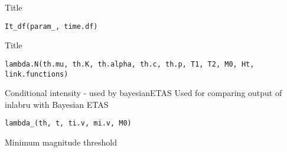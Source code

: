 \documentclass[letterpaper]{book}
\begin{document}
%
\begin{Arguments}
\begin{ldescription}
\item[\code{b}] 
\end{ldescription}
\end{Arguments}
%
\begin{Description}\relax
Title
\end{Description}
%
\begin{Usage}
\begin{verbatim}
It_df(param_, time.df)
\end{verbatim}
\end{Usage}
%
\begin{Arguments}
\begin{ldescription}
\item[\code{time.df}] 
\end{ldescription}
\end{Arguments}
%
\begin{Description}\relax
Title
\end{Description}
%
\begin{Usage}
\begin{verbatim}
lambda.N(th.mu, th.K, th.alpha, th.c, th.p, T1, T2, M0, Ht, link.functions)
\end{verbatim}
\end{Usage}
%
\begin{Arguments}
\begin{ldescription}
\item[\code{link.functions}] 
\end{ldescription}
\end{Arguments}
%
\begin{Description}\relax
Conditional intensity - used by bayesianETAS
Used for comparing output of inlabru with Bayesian ETAS
\end{Description}
%
\begin{Usage}
\begin{verbatim}
lambda_(th, t, ti.v, mi.v, M0)
\end{verbatim}
\end{Usage}
%
\begin{Arguments}
\begin{ldescription}
\item[\code{M0}] Minimum magnitude threshold
\end{ldescription}
\end{Arguments}
\end{document}

